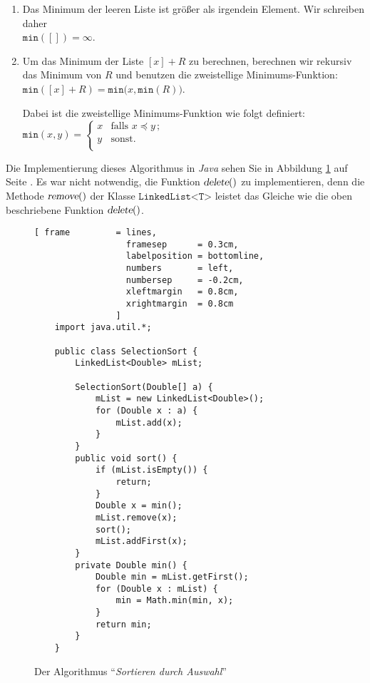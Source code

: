 \begin{enumerate}
\item Das Minimum der leeren Liste ist gr\"o{\ss}er als irgendein Element.  Wir schreiben daher \\[0.2cm]
      \hspace*{1.3cm} $\mathtt{min}([]) = \infty$.
\item Um das Minimum der Liste $[x] + R$ zu berechnen, berechnen wir rekursiv das Minimum
      von $R$ und benutzen die zweistellige Minimums-Funktion: \\[0.2cm]
      \hspace*{1.3cm} 
      $\mathtt{min}([x] + R) = \mathtt{min}\bigl(x, \mathtt{min}(R) \bigr)$. 

      Dabei ist die zweistellige Minimums-Funktion wie folgt definiert: \\[0.2cm]
      \hspace*{1.3cm} 
      $\mathtt{min}(x,y) = \left\{
      \begin{array}{ll}
        x  & \mbox{falls $x \preceq y\,$;} \\
        y  & \mbox{sonst.} \\
      \end{array}\right.
      $
\end{enumerate}
Die Implementierung dieses Algorithmus in \textsl{Java} sehen Sie in Abbildung
\ref{fig:selection-sort} auf Seite \pageref{fig:selection-sort}.  Es war nicht notwendig,
die Funktion $\textsl{delete}()$ zu implementieren, denn die Methode $\textsl{remove}()$
der Klasse $\texttt{LinkedList<T>}$ leistet das Gleiche wie die oben beschriebene Funktion
$\textsl{delete}()$.

\begin{figure}[!ht]
  \centering
\begin{Verbatim}[ frame         = lines, 
                  framesep      = 0.3cm, 
                  labelposition = bottomline,
                  numbers       = left,
                  numbersep     = -0.2cm,
                  xleftmargin   = 0.8cm,
                  xrightmargin  = 0.8cm
                ]
    import java.util.*;
    
    public class SelectionSort {
        LinkedList<Double> mList;
        
        SelectionSort(Double[] a) {
            mList = new LinkedList<Double>();
            for (Double x : a) {
                mList.add(x);
            }
        }
        public void sort() {
            if (mList.isEmpty()) {
                return;
            }
            Double x = min();
            mList.remove(x);
            sort();
            mList.addFirst(x);
        }    
        private Double min() {
            Double min = mList.getFirst();
            for (Double x : mList) {
                min = Math.min(min, x);
            }
            return min;
        }
    }
\end{Verbatim}
\vspace*{-0.3cm}
  \caption{Der Algorithmus ``\emph{Sortieren durch Auswahl}''}
  \label{fig:selection-sort}
\end{figure}

